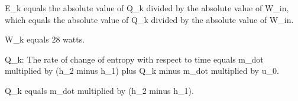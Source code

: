 E_k equals the absolute value of Q_k divided by the absolute value of W_in, which equals the absolute value of Q_k divided by the absolute value of W_in.  

W_k equals 28 watts.  

Q_k:  
The rate of change of entropy with respect to time equals m_dot multiplied by (h_2 minus h_1) plus Q_k minus m_dot multiplied by u_0.  

Q_k equals m_dot multiplied by (h_2 minus h_1).